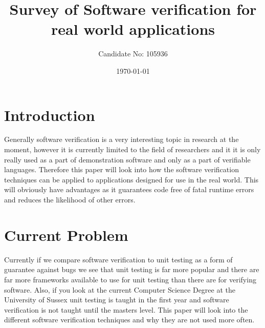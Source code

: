 \documentclass[a4paper,12pt]{scrartcl}
\title{Survey of Software verification for real world applications}
\author{Candidate No: 105936}
\date{\today}
\begin{document}
	
	\begin{titlepage}
		\maketitle
	\end{titlepage}
	
	\tableofcontents
	\newpage
	\section{Introduction}
	{
		Generally software verification is a very interesting topic in research at the moment, however it is currently limited to the field of researchers and it it is only really used as a part of demonstration software and only as a part of verifiable languages. Therefore this paper will look into how the software verification techniques can be applied to applications designed for use in the real world. This will obviously have advantages as it guarantees code free of fatal runtime errors and reduces the likelihood of other errors.
	}

	\section{Current Problem}
	{
		Currently if we compare software verification to unit testing as a form of guarantee against bugs we see that unit testing is far more popular and there are far more frameworks available to use for unit testing than there are for verifying software. Also, if you look at the current Computer Science Degree at the University of Sussex unit testing is taught in the first year and software verification is not taught until the masters level. This paper will look into the different software verification techniques and why they are not used more often.
	}
	
\end{document}
